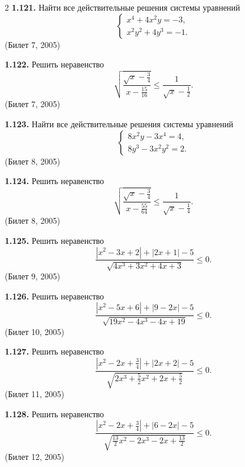 \documentclass[14pt,a4paper,landscape]{extarticle}
\begin{document}
\begin{multicols}{2}
\textbf{1.121.} Найти все действительные решения системы уравнений
\[
\begin{cases}
x^4 + 4x^2y = -3, \\
x^2y^2 + 4y^3 = -1.
\end{cases}
\]
\hfill \textnormal{(Билет 7, 2005)}

\textbf{1.122.} Решить неравенство
\[
\sqrt{\frac{\sqrt{x} - \frac{3}{4}}{x - \frac{15}{16}}} \leqslant \frac{1}{\sqrt{x}- \frac{1}{2}}.
\]
\hfill \textnormal{(Билет 7, 2005)}

\textbf{1.123.} Найти все действительные решения системы уравнений
\[
\begin{cases}
8x^2y - 3x^4 = 4, \\
8y^3 - 3x^2y^2 = 2.
\end{cases}
\]
\hfill \textnormal{(Билет 8, 2005)}

\textbf{1.124.} Решить неравенство
\[
\sqrt{\frac{\sqrt{x} - \frac{3}{4}}{x - \frac{55}{64}}} \leqslant \frac{1}{\sqrt{x} - \frac{1}{4}}.
\]
\hfill \textnormal{(Билет 8, 2005)}

\textbf{1.125.} Решить неравенство
\[
\frac{|x^2 - 3x + 2| + |2x + 1| - 5}{\sqrt{4x^3 + 3x^2 + 4x + 3}} \leqslant 0.
\]
\hfill \textnormal{(Билет 9, 2005)}

\textbf{1.126.} Решить неравенство
\[
\frac{|x^2 - 5x + 6| + |9 - 2x| - 5}{\sqrt{19x^2 - 4x^3 - 4x + 19}} \leqslant 0.
\]
\hfill \textnormal{(Билет 10, 2005)}

\textbf{1.127.} Решить неравенство
\[
\frac{|x^2 - 2x + \frac{3}{4}| + |2x + 2| - 5}{\sqrt{2x^3 + \frac{5}{2}x^2 + 2x + \frac{5}{2}}} \leqslant 0.
\]
\hfill \textnormal{(Билет 11, 2005)}

\textbf{1.128.} Решить неравенство
\[
\frac{|x^2 - 2x + \frac{3}{4}| + |6 - 2x| - 5}{\sqrt{\frac{13}{2}x^2 - 2x^3 - 2x + \frac{13}{2}}} \leqslant 0.
\]
\hfill \textnormal{(Билет 12, 2005)}

\end{multicols}
\end{document}
